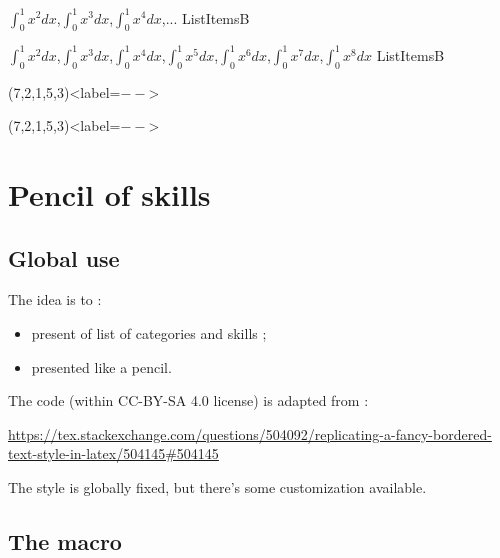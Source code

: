 \documentclass[english,11pt,a4paper]{article}
\begin{document}
\begin{codehigh}[language=latex/latex3,style/main=teal!25,style/code=teal!25]
\CreateItemsList%
    {{$\int_0^1 x^2 dx$},{$\int_0^1 x^3 dx$},{$\int_0^1 x^4 dx$},...}%
    {\mylistofitemsb}{ListItemsB}
\end{codehigh}

\CreateItemsList%
{{$\int_0^1 x^2 dx$},{$\int_0^1 x^3 dx$},{$\int_0^1 x^4 dx$},{$\int_0^1 x^5 dx$},{$\int_0^1 x^6 dx$},{$\int_0^1 x^7 dx$},{$\int_0^1 x^8 dx$}}%
{\mylistofitemsb}{ListItemsB}

\begin{codehigh}[language=latex/latex3,style/main=teal!25,style/code=teal!25]
(7,2,1,5,3)<label=$--$>
\end{codehigh}

(7,2,1,5,3)<label=$--$>

\pagebreak

\section{Pencil of skills}

\subsection{Global use}

The idea is to :

\begin{itemize}
	\item present of list of categories and skills ;
	\item presented like a pencil.
\end{itemize}

The code (within CC-BY-SA 4.0 license) is adapted from :

\hfill{\footnotesize \url{https://tex.stackexchange.com/questions/504092/replicating-a-fancy-bordered-text-style-in-latex/504145#504145}}\hfill~

\begin{codehigh}[language=latex/latex3,style/main=teal!25,style/code=teal!25]
\end{codehigh}

The style is globally fixed, but there's some customization available.

\subsection{The macro}
\end{document}
